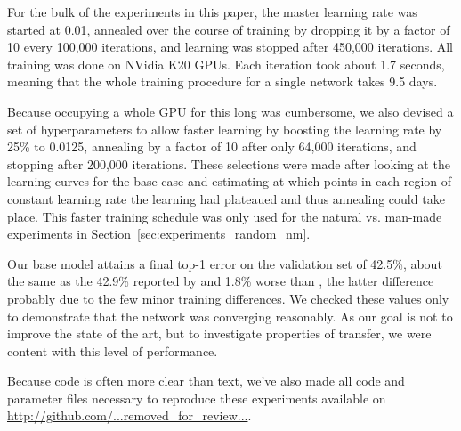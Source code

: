 
For the bulk of the experiments in this paper, the master learning rate was started at 0.01, annealed over the course of training by dropping it by a factor of 10 every 100,000 iterations, and learning was stopped after 450,000 iterations. All training was done on NVidia K20 GPUs. Each iteration took about 1.7 seconds, meaning that the whole training procedure for a single network takes 9.5 days.

Because occupying a whole GPU for this long was cumbersome, we also devised a set of hyperparameters to allow faster learning by boosting the learning rate by 25\% to 0.0125, annealing by a factor of 10 after only 64,000 iterations, and stopping after 200,000 iterations. These selections were made after looking at the learning curves for the base case and estimating at which points in each region of constant learning rate the learning had plateaued and thus annealing could take place.
This faster training schedule was only used for the natural vs. man-made experiments in Section~\ref{sec:experiments_random_nm}.



%

Our base model attains a final top-1 error on the validation set of 42.5\%, about the same as the 42.9\% reported by \cite{donahue+jia-2013-arxiv} and 1.8\% worse than \cite{Krizhevsky-2012}, the latter difference probably due to the few minor training differences. We checked these values only to demonstrate that the network was converging reasonably. As our goal is not to improve the state of the art, but to investigate properties of transfer, we were content with this level of performance.

Because code is often more clear than text, we've also made all code and parameter files necessary to reproduce these experiments available on \url{http://github.com/...removed_for_review...}.






